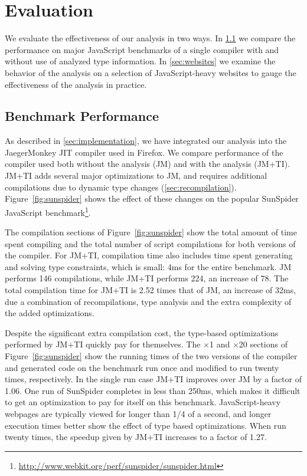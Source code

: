 \section{Evaluation}
\label{sec:evaluation}

We evaluate the effectiveness of our analysis in two ways.
In \Section\ref{sec:benchmarks} we compare the performance on major JavaScript benchmarks
of a single compiler with and without use of analyzed type information.
In \Section\ref{sec:websites} we examine the behavior of the analysis on a selection of
JavaScript-heavy websites to gauge the effectiveness of the analysis in practice.

\subsection{Benchmark Performance}
\label{sec:benchmarks}


As described in \Section\ref{sec:implementation}, we have integrated our analysis into
the JaegerMonkey JIT compiler used in Firefox.
We compare performance of the compiler used both without the analysis (JM)
and with the analysis (JM+TI).
JM+TI adds several major optimizations to JM,
and requires additional compilations due to dynamic type changes
(\Section\ref{sec:recompilation}).
Figure~\ref{fig:sunspider} shows the effect of these changes on the popular
SunSpider JavaScript benchmark\footnote{\url{http://www.webkit.org/perf/sunspider/sunspider.html}}.

The compilation sections of Figure~\ref{fig:sunspider} show the total amount of time
spent compiling and the total number of script compilations for both versions of
the compiler.
For JM+TI, compilation time also includes time spent generating and solving
type constraints, which is small: 4ms for the entire benchmark.
JM performs 146 compilations, while JM+TI performs 224, an increase of 78.
The total compilation time for JM+TI is 2.52 times that of JM, an increase
of 32ms, due a combination of recompilations, type analysis and the extra
complexity of the added optimizations.

Despite the significant extra compilation cost, the type-based optimizations
performed by JM+TI quickly pay for themselves. The $\times$1 and
$\times$20 sections
of Figure~\ref{fig:sunspider} show the running times of the two versions of the
compiler and generated code on the benchmark run once and modified
to run twenty times, respectively.
In the single run case JM+TI improves over JM by a factor of 1.06.
One run of SunSpider completes in less than 250ms, which makes it
difficult to get an optimization to pay for itself on this benchmark.
JavaScript-heavy webpages are typically viewed for longer than
1/4 of a second, and longer execution times better show the effect
of type based optimizations.
When run twenty times, the speedup given by JM+TI increases to a factor of 1.27.

